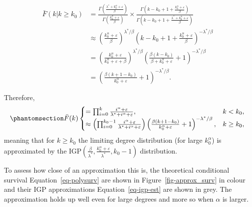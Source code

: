 \documentclass[
  sn-basic,
  10pt,
]{sn-jnl}
\theoremstyle{plain}
\theoremstyle{plain}
\theoremstyle{remark}
\begin{document}
\begin{align*}
\bar F(k|k\ge k_0) &= \frac{\Gamma\left(\frac{\lambda^* + k_0^\alpha + \varepsilon}{\beta}\right)}{\Gamma\left(\frac{k_0^\alpha + \varepsilon}{\beta}\right)}\times\frac{\Gamma\left(k-k_0  +1 + \frac{k_0^\alpha + \varepsilon}{\beta}\right)}{\Gamma\left(k-k_0  +1 + \frac{\lambda^*+ k_0^\alpha + \varepsilon}{\beta}\right)}\\
&\approx\left(\frac{k_0^\alpha+\varepsilon}{\beta}\right)^{\lambda^*/\beta}\left(k-k_0+1+\frac{k_0^\alpha + \varepsilon}{\beta}\right)^{-\lambda^*/\beta}\\
&=\left(\frac{k_0^\alpha+\varepsilon}{k_0^\alpha+\varepsilon + \beta}\right)^{\lambda^*/\beta}\left(\frac{\beta(k-k_0)}{\beta + k_0^\alpha+\varepsilon} + 1\right)^{-\lambda^*/\beta}\\
&=\left(\frac{\beta(k+1-k_0)}{k_0^{\alpha}+\varepsilon} + 1\right)^{-\lambda^{*}/\beta}.
\end{align*}

Therefore, \begin{equation}\phantomsection\label{eq-igp-est}{
\bar F(k) 
\begin{cases}
=\prod_{i=0}^{k}\frac{i^\alpha + \varepsilon}{\lambda^*+i^\alpha + \varepsilon},&k<k_0,\\
\approx \left(\prod_{i=0}^{k_0-1}\frac{i^\alpha + \varepsilon}{\lambda^*+i^\alpha + \varepsilon}\right) \left(\frac{\beta(k+1-k_0)}{k_0^{\alpha}+\varepsilon} + 1\right)^{-\lambda^*/\beta},&k\ge k_0,
\end{cases}
}\end{equation} meaning that for \(k\ge k_0\) the limiting degree
distribution (for large \(k_0^\alpha\)) is approximated by the
\(\text{IGP}\left(\frac{\beta}{\lambda^*}, \frac{k_0^\alpha + \varepsilon}{\lambda^*},k_0-1\right)\)
distribution.

To assess how close of an approximation this is, the theoretical
conditional survival Equation~\ref{eq-polysurv} are shown in
Figure~\ref{fig-approx_surv} in colour and their IGP approximations
Equation~\ref{eq-igp-est} are shown in grey. The approximation holds up
well even for large degrees and more so when \(\alpha\) is larger.
\end{document}
